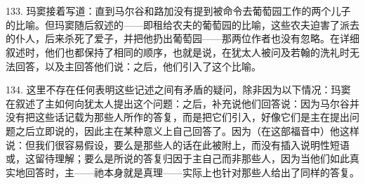 
\section{}


\subsection{}

133. 玛窦接着写道：直到马尔谷和路加没有提到被命令去葡萄园工作的两个儿子的比喻。但玛窦随后叙述的——即租给农夫的葡萄园的比喻，这些农夫迫害了派去的仆人，后来杀死了爱子，并把他扔出葡萄园——那两位作者也没有忽略。在详细叙述时，他们也都保持了相同的顺序，也就是说，在犹太人被问及若翰的洗礼时无法回答，以及主回答他们说：之后，他们引入了这个比喻。\par

134. 这里不存在任何表明这些记述之间有矛盾的疑问，除非因为以下情况：玛窦在叙述了主如何向犹太人提出这个问题：之后，补充说他们回答说：因为马尔谷并没有把这些话记载为那些人所作的答复，而是把它们引入，好像它们是主在提出问题之后立即说的，因此主在某种意义上自己回答了。因为（在这部福音中）他这样说：但我们很容易假设，要么是那些人的话在此被附上，而没有插入说明性短语或，这留待理解；要么是所说的答复归因于主自己而非那些人，因为当他们如此真实地回答时，主——祂本身就是真理——实际上也针对那些人给出了同样的答复。\par

